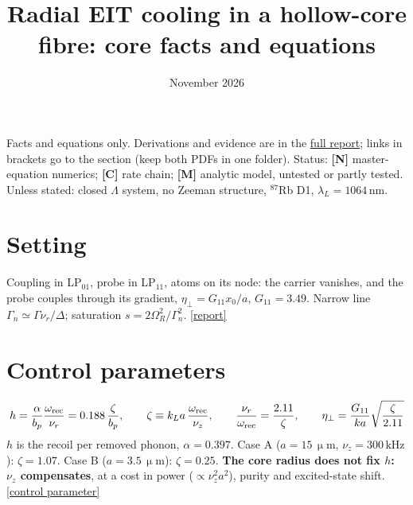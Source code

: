 \documentclass[10pt,a4paper]{article}
\title{Radial EIT cooling in a hollow-core fibre: core facts and equations}
\author{}
\date{November 2026}
\newcommand{\etaeff}{\eta_{\perp}}
\newcommand{\SI}[2]{\ensuremath{#1\,\mathrm{#2}}}
\newcommand{\more}[2]{\href{report.pdf\##1}{[#2]}}
\begin{document}
\maketitle
\noindent Facts and equations only. Derivations and evidence are in the \href{report.pdf}{full report}; links in brackets go to the section (keep both PDFs in one folder). Status: \textbf{[N]} master-equation numerics; \textbf{[C]} rate chain; \textbf{[M]} analytic model, untested or partly tested. Unless stated: closed $\Lambda$ system, no Zeeman structure, $^{87}$Rb D1, $\lambda_L=\SI{1064}{nm}$.

\section*{Setting}
Coupling in LP$_{01}$, probe in LP$_{11}$, atoms on its node: the carrier vanishes, and the probe couples through its gradient, $\etaeff=G_{11}x_0/a$, $G_{11}=3.49$. Narrow line $\Gamma_n\simeq\Gamma\nu_r/\Delta$; saturation $s=2\Omega_R^2/\Gamma_n^2$. \more{d:soft}{report}

\section*{Control parameters}
\begin{equation*}
  h=\frac{\alpha}{b_p}\frac{\omega_{\rm rec}}{\nu_r}=0.188\,\frac{\zeta}{b_p},\qquad
  \zeta\equiv k_La\,\frac{\omega_{\rm rec}}{\nu_z},\qquad
  \frac{\nu_r}{\omega_{\rm rec}}=\frac{2.11}{\zeta},\qquad
  \etaeff=\frac{G_{11}}{ka}\sqrt{\frac{\zeta}{2.11}}
\end{equation*}
$h$ is the recoil per removed phonon, $\alpha=0.397$. Case A ($a=\ensuremath{15\,\upmu\mathrm{m}}$, $\nu_z=\SI{300}{kHz}$): $\zeta=1.07$. Case B ($a=\ensuremath{3.5\,\upmu\mathrm{m}}$): $\zeta=0.25$. \textbf{The core radius does not fix $h$: $\nu_z$ compensates}, at a cost in power ($\propto\nu_z^2a^2$), purity and excited-state shift. \more{d:zeta}{control parameter}
\end{document}
